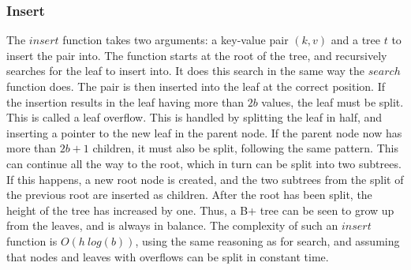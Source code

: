 \subsubsection{Insert}
The $insert$ function takes two arguments: a key-value pair $(k, v)$ and a tree $t$ to insert the pair into. The function starts at the root of the tree, and recursively searches for the leaf to insert into. It does this search in the same way the $search$ function does. The pair is then inserted into the leaf at the correct position. If the insertion results in the leaf having more than $2b$ values, the leaf must be split. This is called a leaf overflow. This is handled by splitting the leaf in half, and inserting a pointer to the new leaf in the parent node. If the parent node now has more than $2b+1$ children, it must also be split, following the same pattern. This can continue all the way to the root, which in turn can be split into two subtrees. If this happens, a new root node is created, and the two subtrees from the split of the previous root are inserted as children. After the root has been split, the height of the tree has increased by one. Thus, a B+ tree can be seen to grow up from the leaves, and is always in balance. The complexity of such an $insert$ function is $O(h~log(b))$, using the same reasoning as for search, and assuming that nodes and leaves with overflows can be split in constant time.

